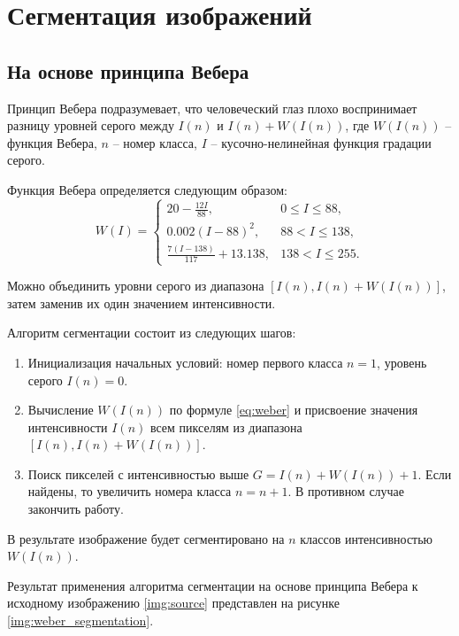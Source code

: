 \section{Сегментация изображений}

\subsection{На основе принципа Вебера}

Принцип Вебера подразумевает, что человеческий глаз плохо воспринимает разницу 
уровней серого между $I(n)$ и $I(n) + W(I(n))$, где $W(I(n))$ -- функция Вебера, 
$n$ -- номер класса, $I$ -- кусочно-нелинейная функция градации серого. 

Функция Вебера определяется следующим образом:
\begin{equation}
    W(I) = \begin{cases}
        20 - \frac{12I}{88}, & 0 \le I \le 88, \\
        0.002 (I - 88)^2, & 88 < I \le 138, \\
        \frac{7(I - 138)}{117} + 13.138, & 138 < I \le 255.
    \end{cases}
    \label{eq:weber}
\end{equation}

Можно объединить уровни серого из диапазона $[I(n), I(n) + W(I(n))]$, затем заменив их один значением интенсивности. 

Алгоритм сегментации состоит из следующих шагов:
\begin{enumerate}
    \item Инициализация начальных условий: номер первого класса $n = 1$, уровень серого $I(n) = 0$. 
    \item Вычисление $W(I(n))$ по формуле \eqref{eq:weber} и присвоение значения интенсивности $I(n)$ всем пикселям из диапазона $[I(n), I(n) + W(I(n))]$.
    \item Поиск пикселей с интенсивностью выше $G = I(n) + W(I(n)) + 1$. Если найдены, то увеличить номера класса $n = n + 1$. В противном случае закончить работу. 
\end{enumerate}

В результате изображение будет сегментировано на $n$ классов интенсивностью $W(I(n))$. 

Результат применения алгоритма сегментации на основе принципа Вебера к исходному изображению \ref{img:source} представлен на рисунке \ref{img:weber_segmentation}.

